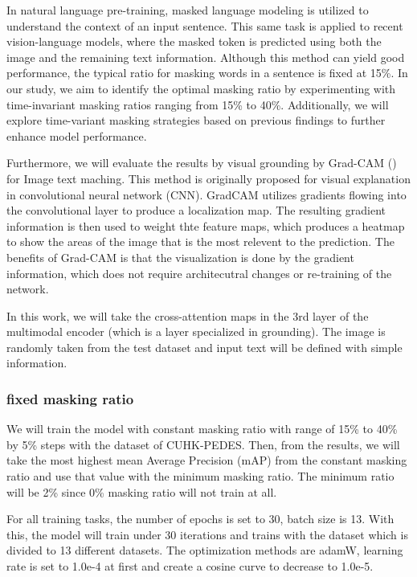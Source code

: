 In natural language pre-training, masked language modeling is utilized to understand the context of an input sentence. This same task is applied to recent vision-language models, where the masked token is predicted using both the image and the remaining text information. Although this method can yield good performance, the typical ratio for masking words in a sentence is fixed at 15\%. In our study, we aim to identify the optimal masking ratio by experimenting with time-invariant masking ratios ranging from 15\% to 40\%. Additionally, we will explore time-variant masking strategies based on previous findings to further enhance model performance.

Furthermore, we will evaluate the results by visual grounding by Grad-CAM (\cite{gradcam}) for Image text maching. This method is originally proposed for visual explanation in convolutional neural network (CNN). GradCAM utilizes gradients flowing into the convolutional layer to produce a localization map. The resulting gradient information is then used to weight thte feature maps, which produces a heatmap to show the areas of the image that is the most relevent to the prediction. The benefits of Grad-CAM is that the visualization is done by the gradient information, which does not require architecutral changes or re-training of the network.

In this work, we will take the cross-attention maps in the 3rd layer of the multimodal encoder (which is a layer specialized in grounding). The image is randomly taken from the test dataset and input text will be defined with simple information.

\subsubsection{fixed masking ratio}
We will train the model with constant masking ratio with range of 15\% to 40\% by 5\% steps with the dataset of CUHK-PEDES. Then, from the results, we will take the most highest mean Average Precision (mAP) from the constant masking ratio and use that value with the minimum masking ratio. The minimum ratio will be 2\% since 0\% masking ratio will not train at all. 

For all training tasks, the number of epochs is set to 30, batch size is 13. With this, the model will train under 30 iterations and trains with the dataset which is divided to 13 different datasets. The optimization methods are adamW, learning rate is set to 1.0e-4 at first and create a cosine curve to decrease to 1.0e-5. 

